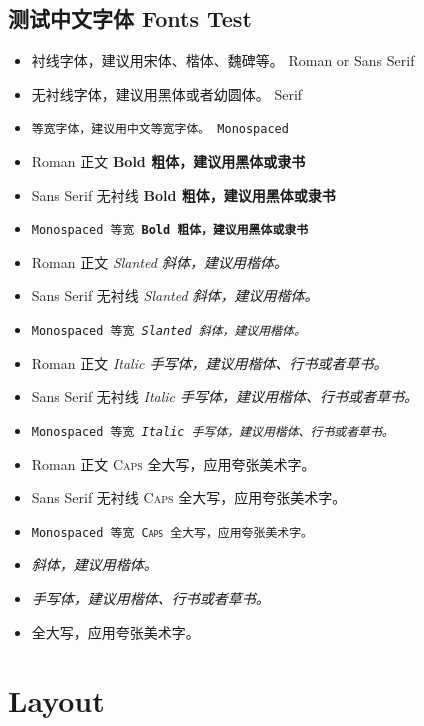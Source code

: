 \documentclass[
        ]{beamer}
\begin{document}
\subsection{测试中文字体 Fonts Test}
\begin{frame}[allowframebreaks]{\subsecname} %
    \begin{itemize}
    \item \textrm{衬线字体，建议用宋体、楷体、魏碑等。	Roman or Sans Serif}
    \item \textsf{无衬线字体，建议用黑体或者幼圆体。	Serif}
    \item \texttt{等宽字体，建议用中文等宽字体。		Monospaced}
    \item \textrm{Roman 	 正文   \textbf{Bold 粗体，建议用黑体或隶书}}
    \item \textsf{Sans Serif 无衬线 \textbf{Bold 粗体，建议用黑体或隶书}}
    \item \texttt{Monospaced 等宽   \textbf{Bold 粗体，建议用黑体或隶书}}
    \item \textrm{Roman 	 正文   \textsl{Slanted 斜体，建议用楷体。}}
    \item \textsf{Sans Serif 无衬线 \textsl{Slanted 斜体，建议用楷体。}}
    \item \texttt{Monospaced 等宽   \textsl{Slanted 斜体，建议用楷体。}}
    \item \textrm{Roman 	 正文   \textit{Italic 手写体，建议用楷体、行书或者草书。}}
    \item \textsf{Sans Serif 无衬线 \textit{Italic 手写体，建议用楷体、行书或者草书。}}
    \item \texttt{Monospaced 等宽   \textit{Italic 手写体，建议用楷体、行书或者草书。}}
    \item \textrm{Roman 	 正文   \textsc{Caps 全大写，应用夸张美术字。}}
    \item \textsf{Sans Serif 无衬线 \textsc{Caps 全大写，应用夸张美术字。}}
    \item \texttt{Monospaced 等宽   \textsc{Caps 全大写，应用夸张美术字。}}
    \item \textsl{斜体，建议用楷体。}
    \item \textit{手写体，建议用楷体、行书或者草书。}
    \item \textsc{全大写，应用夸张美术字。}
    \end{itemize}
\end{frame}


\section{Layout}
\end{document}

